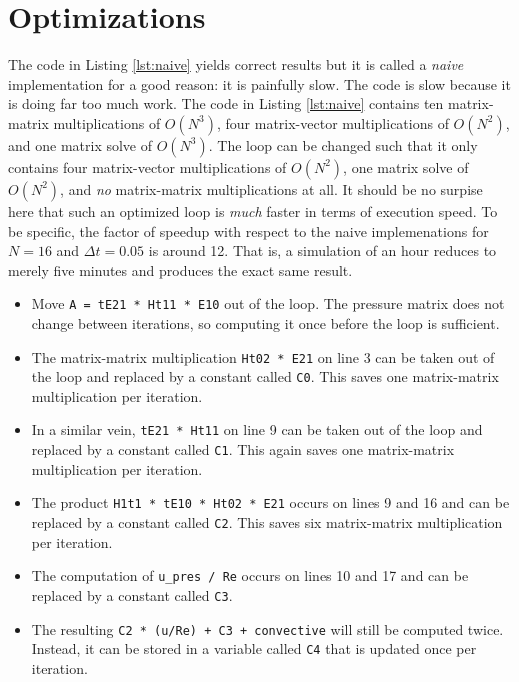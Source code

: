 \documentclass[a4paper,10pt,parskip=half]{scrreprt}
\begin{document}
\section{Optimizations}

The code in Listing \ref{lst:naive} yields correct results but it is called a \emph{naive} implementation for a good reason: it is painfully slow. The code is slow because it is doing far too much work. The code in Listing \ref{lst:naive} contains ten matrix-matrix multiplications of $O(N^3)$, four matrix-vector multiplications of $O(N^2)$, and one matrix solve of $O(N^3)$. The loop can be changed such that it only contains four matrix-vector multiplications of $O(N^2)$, one matrix solve of $O(N^2)$, and \emph{no} matrix-matrix multiplications at all. It should be no surpise here that such an optimized loop is \emph{much} faster in terms of execution speed. To be specific, the factor of speedup with respect to the naive implemenations for $N = 16$ and $\Delta t = 0.05$ is around 12. That is, a simulation of an hour reduces to merely five minutes and produces the exact same result.

\begin{itemize}
    \item Move \lstinline|A = tE21 * Ht11 * E10| out of the loop. The pressure matrix does not change between iterations, so computing it once before the loop is sufficient.
    \item The matrix-matrix multiplication \lstinline|Ht02 * E21| on line 3 can be taken out of the loop and replaced by a constant called \lstinline|C0|. This saves one matrix-matrix multiplication per iteration.
    \item In a similar vein, \lstinline|tE21 * Ht11| on line 9 can be taken out of the loop and replaced by a constant called \lstinline|C1|. This again saves one matrix-matrix multiplication per iteration.
    \item The product \lstinline|H1t1 * tE10 * Ht02 * E21| occurs on lines 9 and 16 and can be replaced by a constant called \lstinline|C2|. This saves six matrix-matrix multiplication per iteration.
    \item The computation of \lstinline|u_pres / Re| occurs on lines 10 and 17 and can be replaced by a constant called \lstinline|C3|.
    \item The resulting \lstinline|C2 * (u/Re) + C3 + convective| will still be computed twice. Instead, it can be stored in a variable called \lstinline|C4| that is updated once per iteration.
\end{itemize}
\end{document}
